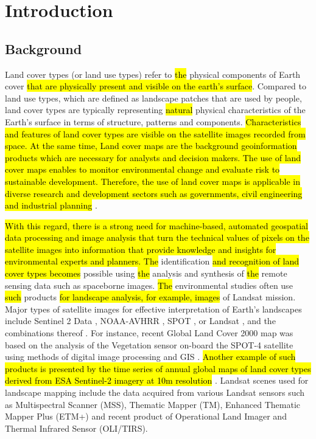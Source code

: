 \documentclass[earth,article,submit,pdftex,moreauthors]{Definitions/mdpi}
\begin{document}
\section{Introduction}

\subsection{Background}
Land cover types (or land use types) refer to \hl{the} physical\hl{ }components of Earth cover \hl{ that are physically present and visible on the earth's surface}. Compared to land use types, which are defined as landscape patches that are used by\hl{ }people, land cover types are typically representing \hl{natural }physical characteristics of the Earth's surface in terms of structure, patterns and components. \hl{Characteristics and features of land cover types are visible on the satellite images recorded from space. At the same time, Land cover maps are the background geoinformation products which are necessary for analysts and decision makers. The use of land cover maps enables to monitor environmental change and evaluate risk to sustainable development. Therefore, the use of land cover maps is applicable in diverse research and development sectors such as governments, civil engineering and industrial planning} \cite{9553499}.

\hl{With this regard, there is a strong need for machine-based, automated geospatial data processing and image analysis that turn the technical values of pixels on the satellite images into information that provide knowledge and insights for environmental experts and planners. The} identification\hl{ and recognition of land cover types becomes }possible using \hl{the }analysis and synthesis of \hl{the }remote sensing data such as spaceborne images. \hl{The} environmental studies often use \hl{such} products\hl{ for landscape analysis, for example, images }of Landsat mission. Major types of satellite images for effective interpretation of Earth's landscapes include Sentinel 2 Data \cite{Ngom,TONG2020111598}, NOAA-AVHRR \cite{KONARSKA2002491,ANYAMBA2005596,Frederiksen}, SPOT \cite{SILVA2005188,MARTINEZ2011152}, or Landsat \cite{PIMPLE2020118007,Lemenkova202315}, and the combinations thereof \cite{rs12193157}. For instance, recent Global Land Cover 2000 map was based on the analysis of the Vegetation sensor on-board the SPOT-4 satellite using methods of digital image processing and GIS \cite{Mayaux}. \hl{Another example of such products is presented by the time series of annual global maps of land cover types derived from ESA Sentinel-2 imagery at 10m resolution }\cite{Karraetal}. Landsat scenes used for landscape mapping include the data acquired from various Landsat sensors such as Multispectral Scanner (MSS), Thematic Mapper (TM), Enhanced Thematic Mapper Plus (ETM+) and recent product of Operational Land Imager and Thermal Infrared Sensor (OLI/TIRS).
\end{document}

